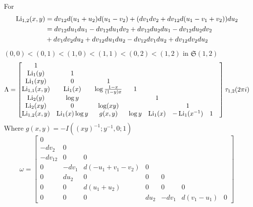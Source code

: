 \documentclass[main]{subfiles}
\begin{document}
\begin{example}
For
\begin{align*}
\operatorname{Li}_{1,2}(x,y)&=dv_{12}d(u_1+u_2)d(u_1-v_2)+(dv_1dv_2+dv_{12}d(u_1-v_1+v_2))du_2 \\
&=dv_{12}du_1du_1-dv_{12}du_1dv_2+dv_{12}du_2du_1-dv_{12}du_2dv_2 \\
&+dv_1dv_2du_2+dv_{12}du_1du_2-dv_{12}dv_1du_2+dv_{12}dv_2du_2
\end{align*}
$(0,0)<(0,1)<(1,0)<(1,1)<(0,2)<(1,2)$ in $\mathfrak S(1,2)$
\[\Lambda=\begin{bmatrix}
1&&&&&&&\\
\operatorname{Li}_{1}(y)&1&&&&&\\
\operatorname{Li}_{1}(xy)&0&1&&&&\\
\operatorname{Li}_{1,1}(x,y)&\operatorname{Li}_1(x)&\log\frac{1-x}{(1-y)x}&1&&&\\
\operatorname{Li}_2(y)&\log y&&&1&&&\\
\operatorname{Li}_{2}(xy)&0&\log(xy)&&&1&&\\
\operatorname{Li}_{1,2}(x,y)&\operatorname{Li}_1(x)\log y&g(x,y)&\log y&\operatorname{Li}_1(x)&-\operatorname{Li}_1(x^{-1})&1
\end{bmatrix}\tau_{1,2}(2\pi i)\]
Where $g(x,y)=-I((xy)^{-1};y^{-1},0;1)$
\[\omega=\begin{bmatrix}
0&&&&&&\\
-dv_2&0&&&&&\\
-dv_{12}&0&0&&&\\
0&-dv_1&d(-u_1+v_1-v_2)&0&&&\\
0&du_2&0&0&0&&\\
0&0&d(u_1+u_2)&0&0&0&\\
0&0&0&du_2&-dv_1&d(v_1-u_1)&0
\end{bmatrix}\]
\end{example}
\end{document}
